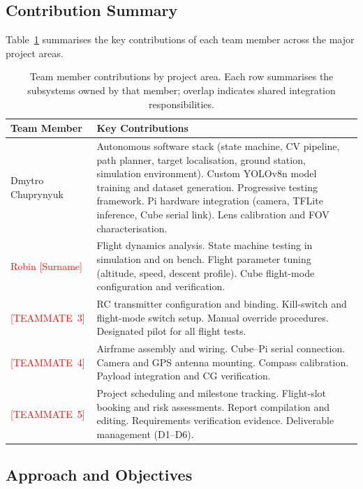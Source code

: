 \subsection*{Contribution Summary}

Table~\ref{tab:contributions} summarises the key contributions of each team member across the major project areas.

\begin{table}[h]
\centering
\caption{Team member contributions by project area.  Each row summarises the subsystems owned by that member; overlap indicates shared integration responsibilities.}
\label{tab:contributions}
\small
\begin{tabular}{p{3.2cm} p{10.5cm}}
\toprule
\textbf{Team Member} & \textbf{Key Contributions} \\
\midrule
Dmytro Chuprynyuk &
Autonomous software stack (state machine, CV pipeline, path planner, target localisation, ground station, simulation environment). Custom YOLOv8n model training and dataset generation. Progressive testing framework. Pi hardware integration (camera, TFLite inference, Cube serial link). Lens calibration and FOV characterisation. \\
\addlinespace
\textcolor{red}{Robin [Surname]} &
Flight dynamics analysis. State machine testing in simulation and on bench. Flight parameter tuning (altitude, speed, descent profile). Cube flight-mode configuration and verification. \\
\addlinespace
\textcolor{red}{[TEAMMATE~3]} &
RC transmitter configuration and binding. Kill-switch and flight-mode switch setup. Manual override procedures. Designated pilot for all flight tests. \\
\addlinespace
\textcolor{red}{[TEAMMATE~4]} &
Airframe assembly and wiring. Cube--Pi serial connection. Camera and GPS antenna mounting. Compass calibration. Payload integration and CG verification. \\
\addlinespace
\textcolor{red}{[TEAMMATE~5]} &
Project scheduling and milestone tracking. Flight-slot booking and risk assessments. Report compilation and editing. Requirements verification evidence. Deliverable management (D1--D6). \\
\bottomrule
\end{tabular}
\end{table}

\subsection*{Approach and Objectives}

